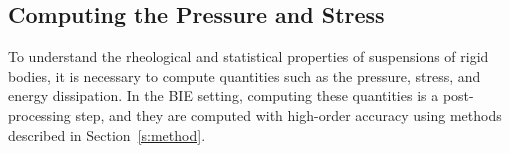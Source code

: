 \documentclass[preprint, 10pt]{elsarticle}
\begin{document}
%
%
\subsection{Computing the Pressure and Stress}
To understand the rheological and statistical properties of suspensions
of rigid bodies, it is necessary to compute quantities such as the
pressure, stress, and energy dissipation.  In the BIE setting, computing
these quantities is a post-processing step, and they are 
computed with high-order accuracy using methods described in
Section~\ref{s:method}.
\end{document}
